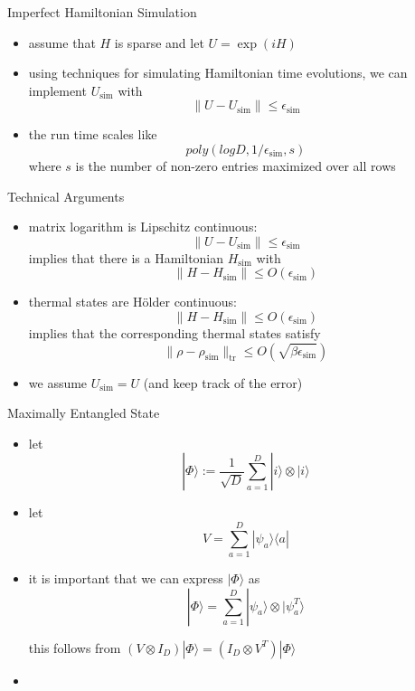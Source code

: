 \documentclass[slideColor]{prosper}
\renewcommand{\>}{\rangle}
\newcommand{\<}{\langle}
\begin{document}
\begin{slide}{Imperfect Hamiltonian Simulation}
\begin{itemize}
\item assume that $H$ is sparse and let $U = \exp(i H)$

\medskip
\item using techniques for simulating Hamiltonian time evolutions, we can implement $U_{\textrm{sim}}$ with
\[
\| U - U_{\textrm{sim}} \| \le \epsilon_{\textrm{sim}}
\]

\medskip
\item the run time scales like 
\[
poly(log D, 1/\epsilon_{\textrm{sim}}, s)
\]
where $s$ is the number of non-zero entries maximized over all rows
\end{itemize}
\end{slide}


\begin{slide}{Technical Arguments}
\begin{itemize}
\vspace{-0.25cm}
\item matrix logarithm is Lipschitz continuous:
\[
\| U - U_{\textrm{sim}} \| \le \epsilon_{\textrm{sim}}
\]
\quad implies that there is a Hamiltonian $H_{\textrm{sim}}$ with
\[
\| H - H_{\textrm{sim}} \| \le O(\epsilon_{\textrm{sim}})
\]

\item thermal states are H\"older continuous:
\[
\| H - H_{\textrm{sim}} \| \le O(\epsilon_{\textrm{sim}})
\]
\quad implies that the corresponding thermal states satisfy
\[
\| \rho - \rho_{\textrm{sim}} \|_{\textrm{tr}} \le O(\sqrt{\beta \epsilon_{\textrm{sim}}})
\]

\item we assume $U_\textrm{sim}=U$ (and keep track of the error)
\end{itemize}
\end{slide}


\begin{slide}{Maximally Entangled State}

\begin{itemize}
\item let
\[
|\Phi\> := \frac{1}{\sqrt{D}} \sum_{a=1}^D |i\> \otimes |i\>
\]

\item let
\[
V = \sum_{a=1}^D |\psi_a\>\<a|
\]

\item it is important that we can express $|\Phi\>$ as
\[
|\Phi\> = \sum_{a=1}^D |\psi_a\> \otimes |\psi^T_a\>
\]

this follows from $(V\otimes I_D)|\Phi\>=(I_D\otimes V^T)|\Phi\>$

\medskip
\item 
\end{itemize}

\end{slide}
\end{document}
